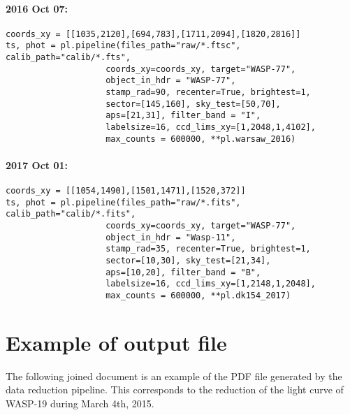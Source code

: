 \paragraph*{2016 Oct 07:}
\begin{verbatim}
coords_xy = [[1035,2120],[694,783],[1711,2094],[1820,2816]]
ts, phot = pl.pipeline(files_path="raw/*.ftsc", calib_path="calib/*.fts",
                    coords_xy=coords_xy, target="WASP-77",
                    object_in_hdr = "WASP-77",
                    stamp_rad=90, recenter=True, brightest=1,
                    sector=[145,160], sky_test=[50,70],
                    aps=[21,31], filter_band = "I",
                    labelsize=16, ccd_lims_xy=[1,2048,1,4102],
                    max_counts = 600000, **pl.warsaw_2016)
\end{verbatim}

\paragraph*{2017 Oct 01:}
\begin{verbatim}
coords_xy = [[1054,1490],[1501,1471],[1520,372]]
ts, phot = pl.pipeline(files_path="raw/*.fits", calib_path="calib/*.fits",
                    coords_xy=coords_xy, target="WASP-77",
                    object_in_hdr = "Wasp-11",
                    stamp_rad=35, recenter=True, brightest=1,
                    sector=[10,30], sky_test=[21,34],
                    aps=[10,20], filter_band = "B",
                    labelsize=16, ccd_lims_xy=[1,2148,1,2048],
                    max_counts = 600000, **pl.dk154_2017)
\end{verbatim}

\section{Example of output file} 

The following joined document is an example of the PDF file generated by the data reduction pipeline. This corresponds to the reduction of the light curve of WASP-19 during March 4th, 2015.


